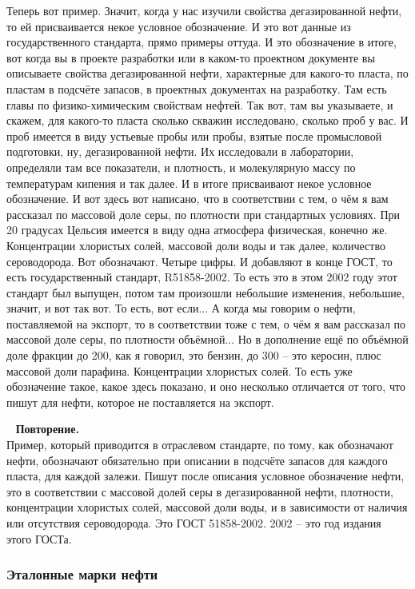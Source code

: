 \documentclass[main.tex]{subfiles}
\begin{document}
Теперь вот пример.
Значит, когда у нас изучили свойства дегазированной нефти, то ей присваивается некое условное обозначение.
И это вот данные из государственного стандарта, прямо примеры оттуда.
И это обозначение в итоге, вот когда вы в проекте разработки или в каком-то проектном документе вы описываете свойства дегазированной нефти, характерные для какого-то пласта, по пластам в подсчёте запасов, в проектных документах на разработку.
Там есть главы по физико-химическим свойствам нефтей.
Так вот, там вы указываете, и скажем, для какого-то пласта сколько скважин исследовано, сколько проб у вас.
И проб имеется в виду устьевые пробы или пробы, взятые после промысловой подготовки, ну, дегазированной нефти.
Их исследовали в лаборатории, определяли там все показатели, и плотность, и молекулярную массу  по температурам кипения и так далее.
И в итоге присваивают некое условное обозначение.
И вот здесь вот написано, что в соответствии с тем, о чём я вам рассказал по массовой доле серы, по плотности при стандартных условиях.
При 20 градусах Цельсия имеется в виду одна атмосфера физическая, конечно же.
Концентрации хлористых солей, массовой доли воды и так далее, количество сероводорода.
Вот обозначают.
Четыре цифры.
И добавляют в конце ГОСТ, то есть государственный стандарт, R51858-2002.
То есть это в этом 2002 году этот стандарт был выпущен, потом там произошли небольшие изменения, небольшие, значит, и вот так вот.
То есть, вот если...
А когда мы говорим о нефти, поставляемой на экспорт, то в соответствии тоже с тем, о чём я вам рассказал по массовой доле серы, по плотности объёмной...
Но в дополнение ещё по объёмной доле фракции до 200, как я говорил, это бензин, до 300 – это керосин, плюс массовой доли парафина.
Концентрации хлористых солей.
То есть уже обозначение такое, какое здесь показано, и оно несколько отличается от того, что пишут для нефти, которое не поставляется на экспорт.

\ \newline
\textbf{Повторение.}\\
Пример, который приводится в отраслевом стандарте, по тому, как обозначают нефти,
обозначают обязательно при описании в подсчёте запасов для каждого пласта, для каждой залежи.
Пишут после описания условное обозначение нефти, это в соответствии с массовой долей серы в дегазированной нефти, плотности, концентрации хлористых солей, массовой доли воды, и в зависимости от наличия или отсутствия сероводорода.
Это ГОСТ 51858-2002.
2002 -- это год издания этого ГОСТа.

\subsubsection{Эталонные марки нефти}
\end{document}
